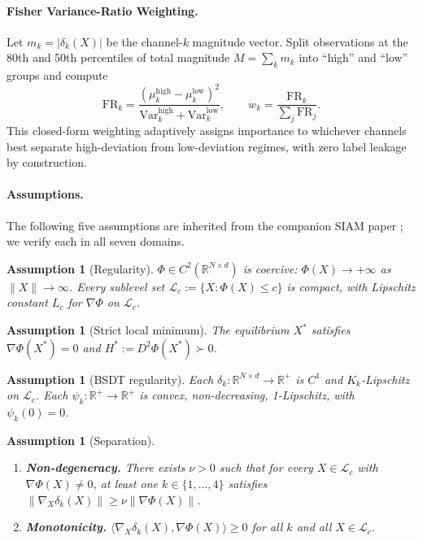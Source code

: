 \documentclass[11pt,a4paper]{article}
\newcommand{\R}{\mathbb{R}}
\newcommand{\Xst}{X^*}
\newcommand{\grad}{\nabla}
\newcommand{\norm}[1]{\|#1\|}
\newcommand{\inner}[2]{\langle #1, #2 \rangle}
\newtheorem{assumption}[theorem]{Assumption}
\begin{document}
\paragraph{Fisher Variance-Ratio Weighting.}
Let $m_k = |\delta_k(X)|$ be the channel-$k$ magnitude vector.  Split
observations at the 80th and 50th percentiles of total magnitude
$M = \sum_k m_k$ into ``high'' and ``low'' groups and compute
\begin{equation}\label{eq:fisher_vr}
  \mathrm{FR}_k
  = \frac{(\mu_k^{\mathrm{high}} - \mu_k^{\mathrm{low}})^2}
         {\mathrm{Var}_k^{\mathrm{high}}
          + \mathrm{Var}_k^{\mathrm{low}}},
  \qquad
  w_k = \frac{\mathrm{FR}_k}{\sum_{j}\mathrm{FR}_j}.
\end{equation}
This closed-form weighting adaptively assigns importance to
whichever channels best separate high-deviation from low-deviation
regimes, with zero label leakage by construction.

\paragraph{Assumptions.}
The following five assumptions are inherited from the companion
SIAM paper \cite{odeyemi2026siam}; we verify each in all seven
domains.

\begin{assumption}[Regularity]\label{ass:reg}
$\Phi\in C^2(\R^{N\times d})$ is coercive:
$\Phi(X)\to+\infty$ as $\norm{X}\to\infty$.  Every sublevel set
$\mathcal{L}_c := \{X:\Phi(X)\le c\}$ is compact, with Lipschitz
constant $L_c$ for $\grad\Phi$ on $\mathcal{L}_c$.
\end{assumption}

\begin{assumption}[Strict local minimum]\label{ass:equil}
The equilibrium $\Xst$ satisfies $\grad\Phi(\Xst)=0$ and
$H^*:=D^2\Phi(\Xst)\succ 0$.
\end{assumption}

\begin{assumption}[BSDT regularity]\label{ass:bsdt}
Each $\delta_k: \R^{N\times d}\to\R^+$ is $C^1$ and
$K_k$-Lipschitz on $\mathcal{L}_c$.  Each $\psi_k:\R^+\to\R^+$
is convex, non-decreasing, 1-Lipschitz, with $\psi_k(0)=0$.
\end{assumption}

\begin{assumption}[Separation]\label{ass:sep}
\begin{enumerate}[nosep]
  \item[\textup{(S1)}] \textbf{Non-degeneracy.}
    There exists $\nu>0$ such that for every
    $X\in\mathcal{L}_c$ with $\grad\Phi(X)\neq 0$, at least one
    $k\in\{1,\ldots,4\}$ satisfies
    $\norm{\grad_X\delta_k(X)}\ge\nu\norm{\grad\Phi(X)}$.
  \item[\textup{(S2)}] \textbf{Monotonicity.}
    $\inner{\grad_X\delta_k(X)}{\grad\Phi(X)}\ge 0$ for all
    $k$ and all $X\in\mathcal{L}_c$.
\end{enumerate}
\end{assumption}
\end{document}
